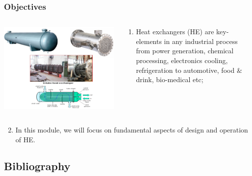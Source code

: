 \documentclass[10pt,compress,unknownkeysallowed]{beamer}
\begin{document}
\begin{frame}
 \frametitle{Objectives}
    \begin{columns}
       \begin{column}[l]{0.6\linewidth}
         \hspace{-.70cm}\includegraphics[width=1.1\columnwidth,clip]{./Pics/HE_Utube}
       \end{column}
       \begin{column}[l]{0.4\linewidth}
          \begin{enumerate}
              \item<1-> Heat exchangers (HE) are key-elements in any industrial process from power generation, chemical processing, electronics cooling, refrigeration to automotive, food $\&$ drink, bio-medical etc;
          \end{enumerate}
       \end{column}      
    \end{columns}
          \begin{enumerate}\setcounter{enumi}{1}
              \item<2-> In this module, we will focus on fundamental aspects of design and operation of HE.
          \end{enumerate}
\end{frame}


\subsection{Bibliography} 
\end{document}
